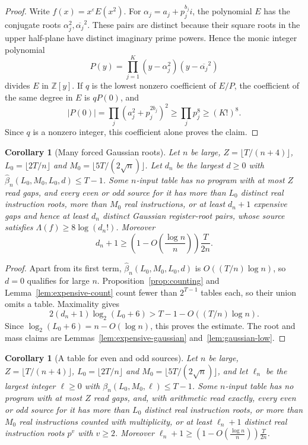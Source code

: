 \documentclass[11pt]{article}
\newtheorem{corollary}[theorem]{Corollary}
\theoremstyle{remark}
\begin{document}
\begin{proof}
Write $f(x)=x^\varepsilon E(x^2)$.  For
$\alpha_j=a_j+p_j^{b_j}i$, the polynomial $E$ has the conjugate roots
$\alpha_j^2,\overline{\alpha_j}^2$.  These pairs are distinct because their
square roots in the upper half-plane have distinct imaginary prime powers.
Hence the monic integer polynomial
\[
 P(y)=\prod_{j=1}^K(y-\alpha_j^2)(y-\overline{\alpha_j}^2)
\]
divides $E$ in $\mathbb Z[y]$.  If $q$ is the lowest nonzero coefficient of
$E/P$, the coefficient of the same degree in $E$ is $qP(0)$, and
\[
 |P(0)|=\prod_j(a_j^2+p_j^{2b_j})^2
 \ge\prod_jp_j^8\ge(K!)^8.
\]
Since $q$ is a nonzero integer, this coefficient alone proves the claim.
\end{proof}

\begin{corollary}[Many forced Gaussian roots]\label{cor:gaussianhard}
Let $n$ be large, $Z=\lfloor T/(n+4)\rfloor$, $L_0=\lfloor2T/n\rfloor$ and
$M_0=\lfloor5T/(2\sqrt n)\rfloor$.  Let $d_n$ be the largest $d\ge0$ with
$\widehat\beta_n(L_0,M_0,L_0,d)\le T-1$.  Some $n$-input table has no program
with at most $Z$ read gaps, and every even or odd source for it has more than
$L_0$ distinct real instruction roots, more than $M_0$ real instructions, or
at least $d_n+1$ expensive gaps and hence at least $d_n$ distinct Gaussian
register-root pairs, whose source satisfies $\Lambda(f)\ge8\log(d_n!)$.
Moreover
\[
 d_n+1\ge\left(1-O\left(\frac{\log n}{n}\right)\right)\frac T{2n}.
\]
\end{corollary}

\begin{proof}
Apart from its first term, $\widehat\beta_n(L_0,M_0,L_0,d)$ is
$O((T/n)\log n)$, so $d=0$ qualifies for large $n$.  Proposition~\ref{prop:counting}
and Lemma~\ref{lem:expensive-count} count fewer than $2^{T-1}$ tables each,
so their union omits a table.  Maximality gives
\[
 2(d_n+1)\log_2(L_0+6)>T-1-O((T/n)\log n).
\]
Since $\log_2(L_0+6)=n-O(\log n)$, this proves the estimate.  The root and
mass claims are Lemmas~\ref{lem:expensive-gaussian} and~\ref{lem:gaussian-low}.
\end{proof}

\begin{corollary}[A table for even and odd sources]\label{cor:evenhard}
Let $n$ be large, $Z=\lfloor T/(n+4)\rfloor$, $L_0=\lfloor2T/n\rfloor$ and
$M_0=\lfloor5T/(2\sqrt n)\rfloor$, and let $\ell_n$ be the largest integer $\ell\ge0$ with
$\beta_n(L_0,M_0,\ell)\le T-1$.  Some $n$-input table has no program with at most $Z$ read
gaps, and, with arithmetic read exactly, every even or odd source for it has more than
$L_0$ distinct real instruction roots, or more than $M_0$ real instructions counted with
multiplicity, or at least $\ell_n+1$ distinct real instruction roots $p^v$ with $v\ge2$.
Moreover $\ell_n+1\ge(1-O(\frac{\log n}n))\frac T{2n}$.
\end{corollary}
\end{document}

